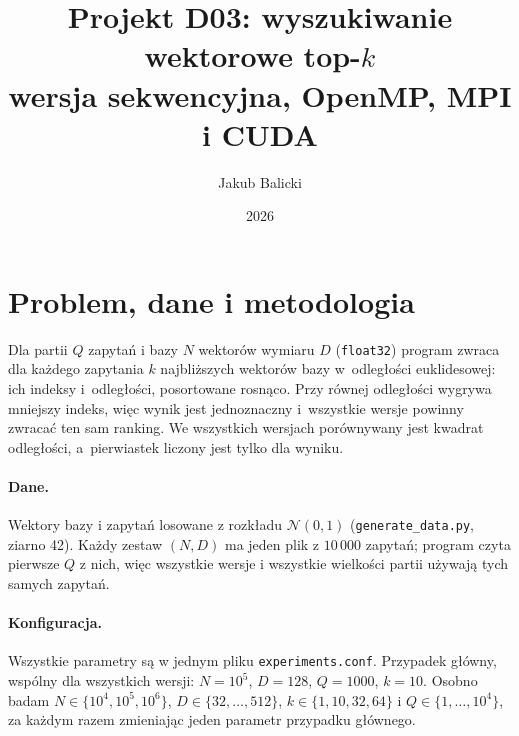 \documentclass[11pt,a4paper]{article}
\title{Projekt D03: wyszukiwanie wektorowe top-$k$\\\large wersja sekwencyjna, OpenMP, MPI i CUDA}
\author{Jakub Balicki}
\date{2026}
\begin{document}
\sloppy
\maketitle

\section{Problem, dane i metodologia}
Dla partii $Q$ zapytań i bazy $N$ wektorów wymiaru $D$ (\texttt{float32}) program zwraca dla każdego zapytania $k$ najbliższych wektorów bazy w~odległości euklidesowej: ich indeksy i~odległości, posortowane rosnąco. Przy równej odległości wygrywa mniejszy indeks, więc wynik jest jednoznaczny i~wszystkie wersje powinny zwracać ten sam ranking. We wszystkich wersjach porównywany jest kwadrat odległości, a~pierwiastek liczony jest tylko dla wyniku.

\paragraph{Dane.} Wektory bazy i zapytań losowane z rozkładu $\mathcal{N}(0,1)$ (\texttt{generate\_data.py}, ziarno 42). Każdy zestaw $(N, D)$ ma jeden plik z $10\,000$ zapytań; program czyta pierwsze $Q$ z nich, więc wszystkie wersje i wszystkie wielkości partii używają tych samych zapytań.

\paragraph{Konfiguracja.} Wszystkie parametry są w jednym pliku \texttt{experiments.conf}. Przypadek główny, wspólny dla wszystkich wersji: $N=10^5$, $D=128$, $Q=1000$, $k=10$. Osobno badam $N\in\{10^4,10^5,10^6\}$, $D\in\{32,\dots,512\}$, $k\in\{1,10,32,64\}$ i $Q\in\{1,\dots,10^4\}$, za każdym razem zmieniając jeden parametr przypadku głównego.
\end{document}
